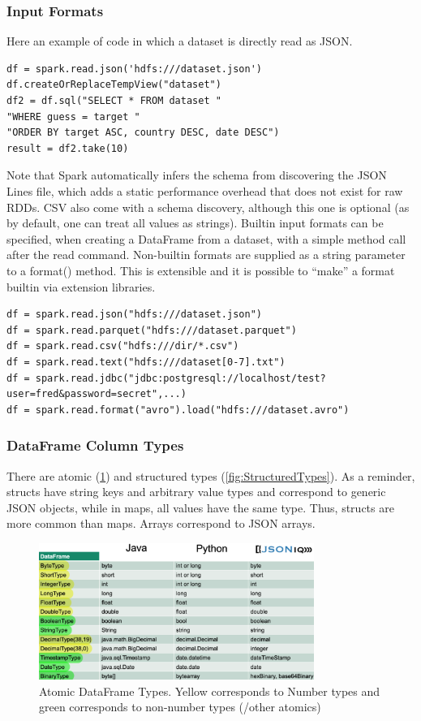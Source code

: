 \subsubsection{Input Formats}
Here an example of code in which a dataset is directly read as JSON. 

\begin{lstlisting}[style=neutral]
df = spark.read.json('hdfs:///dataset.json')
df.createOrReplaceTempView("dataset")
df2 = df.sql("SELECT * FROM dataset "
"WHERE guess = target "
"ORDER BY target ASC, country DESC, date DESC")
result = df2.take(10)
\end{lstlisting}

Note that Spark automatically infers the schema from discovering the JSON Lines file, which adds a static performance overhead that does not exist for raw RDDs. CSV also come with a schema discovery, although this one is optional (as by default, one can treat all values as strings). Builtin input formats can be specified, when creating a DataFrame from a dataset, with a simple method call after the read command. Non-builtin formats are supplied as a string parameter to a format() method. This is extensible and it is possible to “make” a format builtin via extension libraries.

\begin{lstlisting}[style=neutral]
df = spark.read.json("hdfs:///dataset.json")
df = spark.read.parquet("hdfs:///dataset.parquet")
df = spark.read.csv("hdfs:///dir/*.csv")
df = spark.read.text("hdfs:///dataset[0-7].txt")
df = spark.read.jdbc("jdbc:postgresql://localhost/test?user=fred&password=secret",...)
df = spark.read.format("avro").load("hdfs:///dataset.avro")
\end{lstlisting}

\subsubsection{DataFrame Column Types}
There are atomic (\cref{fig:AtomicTypes}) and structured types (\cref{fig:StructuredTypes}). As a reminder, structs have string keys and arbitrary value types and correspond to generic JSON objects, while in maps, all values have the same type. Thus, structs are more common than maps. Arrays correspond to JSON arrays.

\begin{figure}[h]
    \centering
    \includegraphics[width=0.8\textwidth]{Figures/DataFrameTypes.png}
    \caption{Atomic DataFrame Types. Yellow corresponds to Number types and green corresponds to non-number types (/other atomics)}\label{fig:AtomicTypes}
\end{figure}

